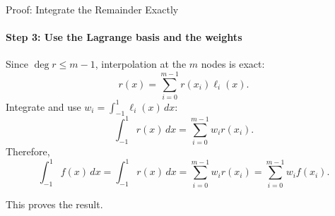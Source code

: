 \documentclass[10pt]{beamer}
\begin{document}
\begin{frame}{Proof: Integrate the Remainder Exactly}
\framesubtitle{Step 3: Use the Lagrange basis and the weights}
\setlength{\abovedisplayskip}{4pt}
\setlength{\belowdisplayskip}{4pt}
Since $\deg r\le m-1$, interpolation at the $m$ nodes is exact:
\[
    r(x)=\sum_{i=0}^{m-1}r(x_i)\ell_i(x).
\]
Integrate and use $w_i=\displaystyle\int_{-1}^1\ell_i(x)\,dx$:
\[
    \int_{-1}^1 r(x)\,dx=\sum_{i=0}^{m-1}w_i r(x_i).
\]
Therefore,
\[
    \boxed{\int_{-1}^1 f(x)\,dx
    =\int_{-1}^1 r(x)\,dx
    =\sum_{i=0}^{m-1}w_i r(x_i)
    =\sum_{i=0}^{m-1}w_i f(x_i).}
\]
\begin{alertblock}{}
This proves the result.
\end{alertblock}
\end{frame}


        
\end{document}
